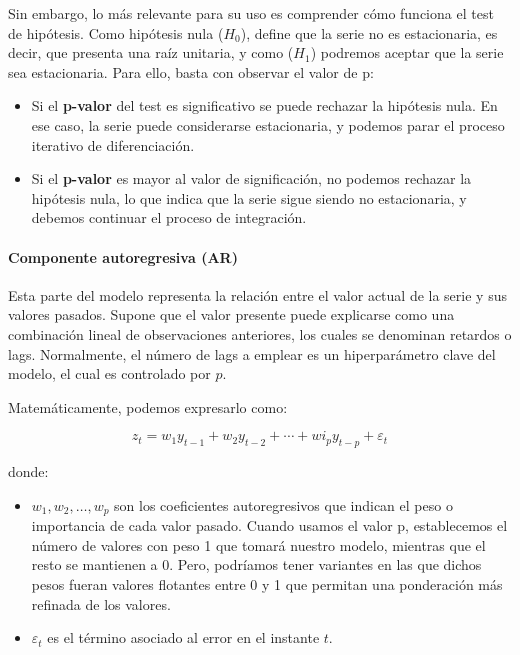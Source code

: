 \begin{itemize}
	Sin embargo, lo más relevante para su uso es comprender cómo funciona el test de hipótesis. Como hipótesis nula (\( H_0 \)), define que la serie no es estacionaria, es decir, que presenta una raíz unitaria, y como (\( H_1 \)) podremos aceptar que la serie sea estacionaria. Para ello, basta con observar el valor de p:
	
	\begin{itemize}
		\item Si el \textbf{p-valor} del test es significativo se puede rechazar la hipótesis nula. En ese caso, la serie puede considerarse estacionaria, y podemos parar el proceso iterativo de diferenciación.
		\item Si el \textbf{p-valor} es mayor al valor de significación, no podemos rechazar la hipótesis nula, lo que indica que la serie sigue siendo no estacionaria, y debemos continuar el proceso de integración.
	\end{itemize}
	
\end{itemize}


\paragraph{Componente autoregresiva (AR)}


Esta parte del modelo representa la relación entre el valor actual de la serie y sus valores pasados. Supone que el valor presente puede explicarse como una combinación lineal de observaciones anteriores, los cuales se denominan retardos o lags. Normalmente, el número de lags a emplear es un hiperparámetro clave del modelo, el cual es controlado por  \( p \).

	Matemáticamente, podemos expresarlo como:
	
	\[
	z_t = w_1 y_{t-1} + w_2 y_{t-2} + \cdots + wi_p y_{t-p} + \varepsilon_t
	\]
	
	donde:
	\begin{itemize}
		\item \( w_1, w_2, \ldots, w_p \) son los coeficientes autoregresivos que indican el peso o importancia de cada valor pasado. Cuando usamos el valor p, establecemos el número de valores con peso 1 que tomará nuestro modelo, mientras que el resto se mantienen a 0.  Pero, podríamos tener variantes en las que dichos pesos fueran valores flotantes entre 0 y 1 que permitan una ponderación más refinada de los valores.
		\item \( \varepsilon_t \) es el término asociado al error en el instante \( t \).
	\end{itemize}
	

